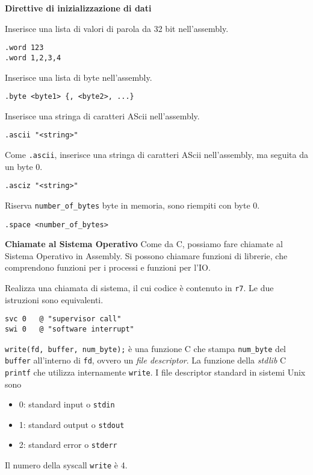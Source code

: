 \begin{defn}
\textbf{Direttive di inizializzazione di dati}

Inserisce una lista di valori di parola da 32 bit nell'assembly.
\begin{lstlisting}[style=arm]
.word 123
.word 1,2,3,4
\end{lstlisting}

Inserisce una lista di byte nell'assembly.
\begin{lstlisting}[style=arm]
.byte <byte1> {, <byte2>, ...}
\end{lstlisting}

Inserisce una stringa di caratteri AScii nell'assembly.
\begin{lstlisting}[style=arm]
.ascii "<string>"
\end{lstlisting}

Come \verb|.ascii|, inserisce una stringa di caratteri AScii nell'assembly, ma seguita da un byte 0.
\begin{lstlisting}[style=arm]
.asciz "<string>"
\end{lstlisting}

Riserva \verb|number_of_bytes| byte in memoria, sono riempiti con byte 0.
\begin{lstlisting}[style=arm]
.space <number_of_bytes>
\end{lstlisting}
\end{defn}

\begin{defn}
\textbf{Chiamate al Sistema Operativo}
Come da C, possiamo fare chiamate al Sistema Operativo in Assembly. Si possono chiamare funzioni di librerie, che comprendono funzioni per i processi e funzioni per l'IO.

Realizza una chiamata di sistema, il cui codice è contenuto in \verb|r7|. Le due istruzioni sono equivalenti.
\begin{lstlisting}[style=arm]
svc 0	@ "supervisor call"
swi 0	@ "software interrupt"
\end{lstlisting}
\end{defn}

\begin{exmp}
\verb|write(fd, buffer, num_byte);| è una funzione C che stampa \verb|num_byte| del \verb|buffer| all'interno di \verb|fd|, ovvero un \textit{file descriptor}. La funzione della \textit{stdlib} C \verb|printf| che utilizza internamente \verb|write|. I file descriptor standard in sistemi Unix sono
\begin{itemize}
	\item 0: standard input o \verb|stdin|
	\item 1: standard output o \verb|stdout|
	\item 2: standard error o \verb|stderr|
\end{itemize}

Il numero della syscall \verb|write| è 4.
\end{exmp}

